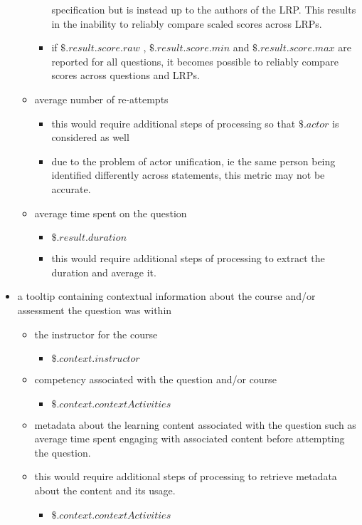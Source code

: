 \documentclass{article}
\begin{document}
\begin{itemize}
\begin{itemize}
\begin{itemize}
      specification but is instead up to the authors of the LRP. This
      results in the inability to reliably compare scaled scores across LRPs.
    \item if $\$.result.score.raw$ , $\$.result.score.min$ and
      $\$.result.score.max$ are reported for all questions, it becomes
      possible to reliably compare scores across questions and LRPs.
    \end{itemize}
  \item average number of re-attempts
    \begin{itemize}
      \item this would require additional steps of processing so that
        $\$.actor$ is considered as well
      \item due to the problem of actor unification, ie the same
        person being identified differently across statements, this
        metric may not be accurate.
      \end{itemize}
    \item average time spent on the question
      \begin{itemize}
      \item $\$.result.duration$
      \item this would require additional steps of processing to
        extract the duration and average it.
      \end{itemize}
    \end{itemize}
  \item a tooltip containing contextual information about the course
    and/or assessment the question was within
    \begin{itemize}
    \item the instructor for the course
      \begin{itemize}
      \item $\$.context.instructor$
      \end{itemize}
    \item competency associated with the question and/or course
      \begin{itemize}
      \item $\$.context.contextActivities$
      \end{itemize}
    \item metadata about the learning content associated with the
      question such as average time spent engaging with associated
      content before attempting the question.
    \item this would require additional steps of processing to
      retrieve metadata about the content and its usage.
      \begin{itemize}
      \item $\$.context.contextActivities$
      \end{itemize}
    \end{itemize}
\end{itemize}
\end{document}
